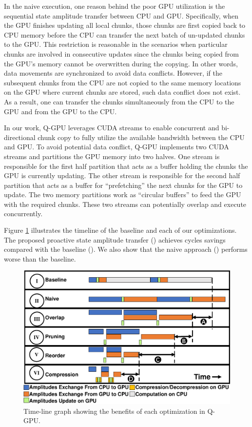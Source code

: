 In the naive execution, one reason behind the poor GPU utilization is the sequential state amplitude transfer between CPU and GPU. Specifically, when the GPU finishes updating all local chunks, those chunks are first copied back to CPU memory before the CPU can transfer the next batch of un-updated chunks to the GPU. This restriction is reasonable in the scenarios when particular chunks are involved in consecutive updates since the chunks being copied from the GPU's memory cannot be overwritten during the copying. In other words, data movements are synchronized to avoid data conflicts.
However, if the subsequent chunks from the CPU are not copied to the same memory locations on the GPU where current chunks are stored, such data conflict does not exist. As a result, one can transfer the chunks simultaneously from the CPU to the GPU and from the GPU to the CPU.

In our work, Q-GPU leverages CUDA streams to enable concurrent and bi-directional chunk copy to fully utilize the available bandwidth between the CPU and GPU. To avoid potential data conflict, Q-GPU implements two CUDA streams and partitions the GPU memory into two halves. One stream is responsible for the first half partition that acts as a buffer holding the chunks the GPU is currently updating. The other stream is responsible for the second half partition that acts as a buffer for ``prefetching'' the next chunks for the GPU to update. The two memory partitions work as ``circular buffers'' to feed the GPU with the required chunks. These two streams can potentially overlap and execute concurrently. 

\par Figure \ref{fig:timeline-overlap} illustrates the timeline of the baseline and each of our optimizations. The proposed proactive state amplitude transfer () achieves  cycles savings compared with the baseline (). We also show that the naive approach () performs worse than the baseline. 

\begin{figure}[t!]
    \includegraphics[width=\textwidth]{Images/appendix2/section-4/timeline.pdf}
    \centering
    \caption{Time-line graph showing the benefits of each optimization in Q-GPU.}
    \label{fig:timeline-overlap}
    \vspace{-5pt}
\end{figure}

